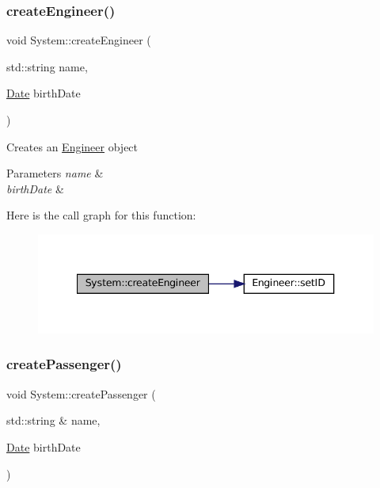 \subsubsection{\texorpdfstring{create\+Engineer()}{createEngineer()}}
{\footnotesize\ttfamily void System\+::create\+Engineer (\begin{DoxyParamCaption}\item[{std\+::string}]{name,  }\item[{\mbox{\hyperlink{classDate}{Date}}}]{birth\+Date }\end{DoxyParamCaption})}

Creates an \mbox{\hyperlink{classEngineer}{Engineer}} object


\begin{DoxyParams}{Parameters}
{\em name} & \\
\hline
{\em birth\+Date} & \\
\hline
\end{DoxyParams}
Here is the call graph for this function\+:
\nopagebreak
\begin{figure}[H]
\begin{center}
\leavevmode
\includegraphics[width=340pt]{classSystem_ae08e68de517d1a18828c55ff3fab2cc9_cgraph}
\end{center}
\end{figure}
\mbox{\label{classSystem_a635ad100d71c3d964047376505d7850b}} 
\subsubsection{\texorpdfstring{create\+Passenger()}{createPassenger()}}
{\footnotesize\ttfamily void System\+::create\+Passenger (\begin{DoxyParamCaption}\item[{std\+::string \&}]{name,  }\item[{\mbox{\hyperlink{classDate}{Date}}}]{birth\+Date }\end{DoxyParamCaption})}



